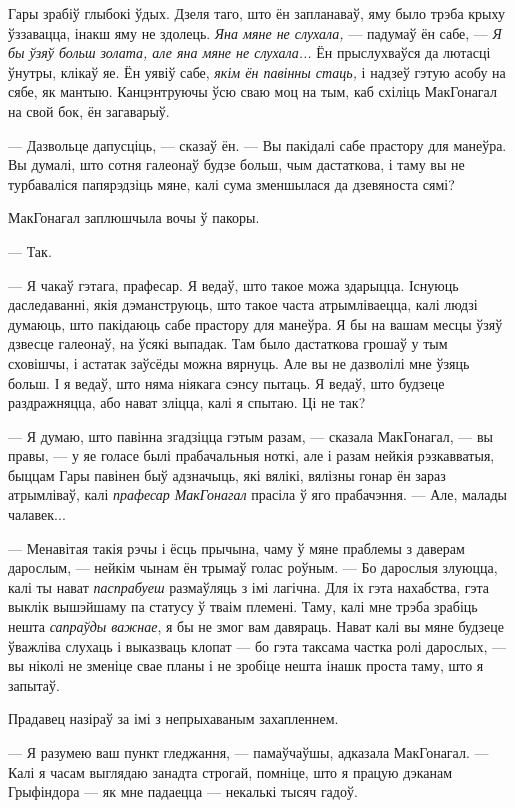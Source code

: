 Гары зрабіў глыбокі ўдых. Дзеля таго, што ён запланаваў, яму было трэба крыху ўззавацца,
інакш яму не здолець. \emph{Яна мяне не слухала,} --- падумаў ён сабе, --- \emph{Я
бы ўзяў больш золата, але яна мяне не слухала...} Ён прыслухваўся да лютасці ўнутры,
клікаў яе. Ён уявіў сабе, \emph{якім ён павінны стаць,} і надзеў гэтую асобу на сябе,
як мантыю. Канцэнтруючы ўсю сваю моц на тым, каб схіліць МакГонагал на свой бок, 
ён загаварыў.

--- Дазвольце дапусціць, --- сказаў ён. --- Вы пакідалі сабе прастору для манеўра.
Вы думалі, што сотня галеонаў будзе больш, чым дастаткова, і таму вы не турбаваліся
папярэдзіць мяне, калі сума зменшылася да дзевяноста сямі?

МакГонагал заплюшчыла вочы ў пакоры. 

--- Так.

--- Я чакаў гэтага, прафесар. Я ведаў, што такое можа здарыцца. Існуюць даследаванні,
якія дэманструюць, што такое часта атрымліваецца, калі людзі думаюць, што пакідаюць
сабе прастору для манеўра. Я бы на вашам месцы ўзяў дзвесце галеонаў, на ўсякі выпадак.
Там было дастаткова грошаў у тым сховішчы, і астатак заўсёды можна вярнуць. Але вы не
дазволілі мне ўзяць больш. І я ведаў, што няма ніякага сэнсу пытаць. 
Я ведаў, што будзеце раздражняцца, або нават зліцца, калі я спытаю. Ці не так?

--- Я думаю, што павінна згадзіцца гэтым разам, --- сказала МакГонагал, 
--- вы правы, --- у яе голасе былі прабачальныя ноткі, але і разам нейкія рэзкавватыя, быццам Гары павінен 
быў адзначыць, які вялікі, вялізны гонар ён зараз атрымліваў, калі \emph{
прафесар МакГонагал} прасіла ў яго прабачэння. --- Але, малады чалавек...


--- Менавітая такія рэчы і ёсць прычына, чаму ў мяне праблемы 
з даверам дарослым, --- нейкім чынам ён трымаў голас роўным. --- Бо 
дарослыя злуюцца, калі ты нават \emph{паспрабуеш} размаўляць з імі
лагічна. Для іх гэта нахабства, гэта выклік вышэйшаму па статусу ў тваім
племені. Таму, калі мне трэба зрабіць нешта \emph{сапраўды важнае}, 
я бы не змог вам давяраць. Нават калі вы мяне будзеце ўважліва слухаць
і выказваць клопат --- бо гэта таксама частка ролі дарослых, --- вы ніколі
не зменіце свае планы і не зробіце нешта інашк проста таму, што я запытаў.

Прадавец назіраў за імі з непрыхаваным захапленнем. 

--- Я разумею ваш пункт гледжання, --- памаўчаўшы, адказала МакГонагал. ---
Калі я часам выглядаю занадта строгай, помніце, што я працую дэканам Грыфіндора
--- як мне падаецца --- некалькі тысяч гадоў.

